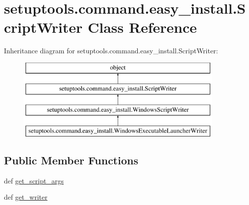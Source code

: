 \hypertarget{classsetuptools_1_1command_1_1easy__install_1_1ScriptWriter}{}\section{setuptools.\+command.\+easy\+\_\+install.\+Script\+Writer Class Reference}
\label{classsetuptools_1_1command_1_1easy__install_1_1ScriptWriter}
Inheritance diagram for setuptools.\+command.\+easy\+\_\+install.\+Script\+Writer\+:\begin{figure}[H]
\begin{center}
\leavevmode
\includegraphics[height=4.000000cm]{classsetuptools_1_1command_1_1easy__install_1_1ScriptWriter}
\end{center}
\end{figure}
\subsection*{Public Member Functions}
\begin{DoxyCompactItemize}
\item 
def \hyperlink{classsetuptools_1_1command_1_1easy__install_1_1ScriptWriter_a0340e444a3a20a908bdf68780609e4b2}{get\+\_\+script\+\_\+args}
\item 
def \hyperlink{classsetuptools_1_1command_1_1easy__install_1_1ScriptWriter_af721ab6a4338d949d988db290dab3854}{get\+\_\+writer}
\end{DoxyCompactItemize}
